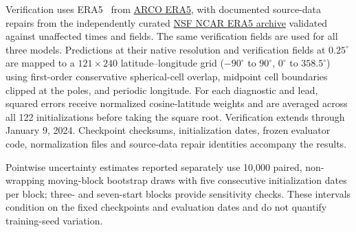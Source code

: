 Verification uses ERA5~\citep{hersbach2020era5} from
\href{https://github.com/google-research/arco-era5}{ARCO ERA5}, with
documented source-data repairs from the independently curated
\href{https://doi.org/10.5065/BH6N-5N20}{NSF NCAR ERA5 archive} validated
against unaffected times and fields. The same verification fields are
used for all three models. Predictions at their native resolution and
verification fields at $0.25^\circ$ are mapped to a $121\times240$
latitude--longitude grid ($-90^\circ$ to $90^\circ$, $0^\circ$ to
$358.5^\circ$) using first-order conservative spherical-cell overlap,
midpoint cell boundaries clipped at the poles, and periodic longitude.
For each diagnostic and lead, squared errors receive normalized
cosine-latitude weights and are averaged across all 122 initializations
before taking the square root. Verification extends through January 9,
2024. Checkpoint checksums, initialization dates, frozen evaluator code,
normalization files and source-data repair identities accompany the results.

Pointwise uncertainty estimates reported separately use 10,000 paired,
non-wrapping moving-block bootstrap draws with five consecutive
initialization dates per block; three- and seven-start blocks provide
sensitivity checks. These intervals condition on the fixed checkpoints
and evaluation dates and do not quantify training-seed variation.

